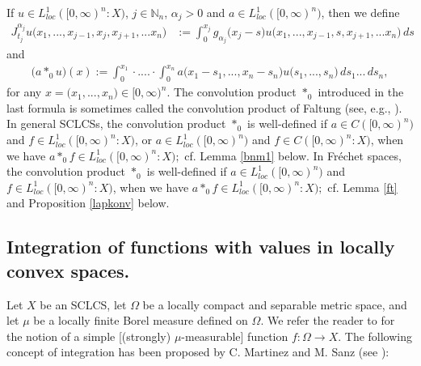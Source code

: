 \documentclass{amsart}
\theoremstyle{definition}
\theoremstyle{remark}
\numberwithin{equation}{section}
\begin{document}
If $u\in L_{loc}^{1}([0,\infty)^{n}:X)$, $j\in {\mathbb N}_{n}$, $\alpha_{j}>0$ and $a\in L_{loc}^{1}([0,\infty)^{n})$, then we define 
\begin{align*}
J_{t_{j}}^{\alpha_{j}} u\bigl(x_{1},...,x_{j-1},x_{j},x_{j+1},...x_{n}\bigr)&:=\int^{x_{j}}_{0}g_{\alpha_{j}}\bigl( x_{j}-s\bigr)u\bigl(x_{1},...,x_{j-1},s,x_{j+1},...x_{n}\bigr)\, ds
\end{align*}
and
\begin{align*}                    
\bigl(a\ast_{0}u\bigr)(x) := \int^{x_{1}}_{0}\cdot ....\cdot \int^{x_{n}}_{0}a\bigl( x_{1}-s_{1},...,x_{n}-s_{n}\bigr)u\bigl(s_{1},...,s_{n}\bigr)\, ds_{1} ...\, ds_{n},
\end{align*}
for any $ x=\bigl(x_{1},...,x_{n}\bigr)\in [0,\infty)^{n}.$ The convolution product $\ast_{0}$ introduced in the last formula is sometimes called the convolution product of Faltung (see, e.g., \cite[p. 232]{debnath}). In general SCLCSs, the convolution product $\ast_{0}$ is well-defined if $a\in C([0,\infty)^{n})$ and $f\in L_{loc}^1([0,\infty)^{n}:X)$, or  
$a\in L_{loc}^1([0,\infty)^{n})$ and $f\in C([0,\infty)^{n}:X)$, when we have $a\ast_{0}f\in  L_{loc}^1([0,\infty)^{n}:X);$ cf. Lemma \ref{bnm1} below. In Fr\' echet spaces, the convolution product $\ast_{0}$ is well-defined if $a\in  L_{loc}^1([0,\infty)^{n})$ and $f\in L_{loc}^1([0,\infty)^{n}:X)$, when we have $a\ast_{0}f\in  L_{loc}^1([0,\infty)^{n}:X);$ cf. Lemma \ref{ft} and  Proposition \ref{lapkonv} below. 

\subsection{Integration of functions with values in locally convex spaces.}\label{zoki}

Let $X$ be an SCLCS,
let $\Omega$ be a locally compact and separable metric space, and let $\mu$ be a locally finite Borel measure defined on $\Omega$. We refer the reader to \cite[Definition 1.1.1]{FKP} for the notion of a simple [(strongly) $\mu$-measurable] function $f: \Omega\to X.$ The following concept of integration has been proposed by C. Martinez and M. Sanz (see \cite[pp.\,99--102]{martinez}):
\end{document}
